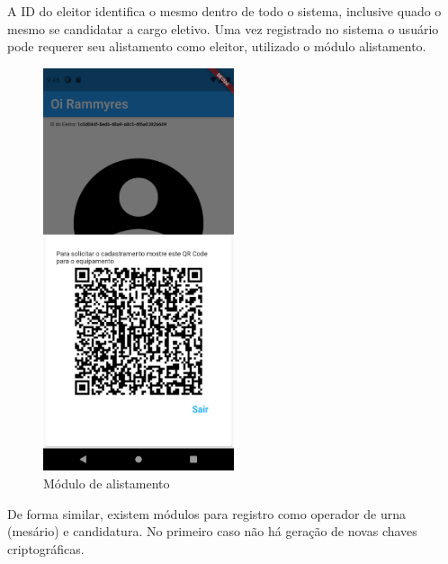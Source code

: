 A ID do eleitor identifica o mesmo dentro de todo o sistema, inclusive quado o mesmo se candidatar a cargo eletivo. Uma vez registrado no sistema o usuário pode requerer seu alistamento como eleitor, utilizado o módulo alistamento.

\begin{figure}[!htb]
	\centering
	\includegraphics[width=0.5\textwidth]{imagens/wallet2}
	\caption{Módulo de alistamento}
	\label{fig:wallet2}
\end{figure}

De forma similar, existem módulos para registro como operador de urna (mesário) e candidatura. No primeiro caso não há geração de novas chaves criptográficas. 

